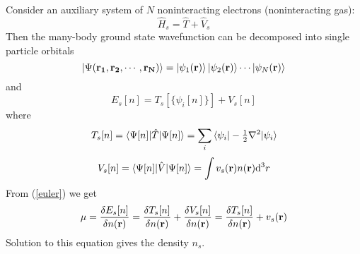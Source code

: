 Consider an auxiliary system of $N$ noninteracting electrons (noninteracting gas): 
\begin{equation*}
  \hat H_s=\hat T+\hat V_s
\end{equation*}
Then the many-body ground state wavefunction can be decomposed into single particle orbitals 
\begin{equation*}
  \mathinner{|{\Psi ({\bf r_1},{\bf r_2},\cdots,{\bf r_N})}\rangle}= \mathinner{|{\psi_1({\bf r})}\rangle}\mathinner{|{\psi_2({\bf r})}\rangle}\cdots\mathinner{|{\psi_N({\bf r})}\rangle}
\end{equation*}
and 
\begin{equation*}
  E_s[n]=T_s[\{\psi_i[n]\}]+V_s[n]
\end{equation*}
where 
\begin{equation*}
  T_s[n]=\mathinner{\langle{\Psi[n]|\hat T|\Psi[n]}\rangle}= \sum_i\mathinner{\langle{\psi_i|-{\textstyle{1\over2}}\nabla^2|\psi_i}\rangle}
\end{equation*}
\begin{equation*}
  V_s[n]=\mathinner{\langle{\Psi[n]|\hat V|\Psi[n]}\rangle}=\int v_s({\bf r})n({\bf r}){\rm d}^3r
\end{equation*}
From (\ref{euler}) we get 
\begin{equation}
  \mu={\delta E_s[n]\over\delta n({\bf r})}= {\delta T_s[n]\over\delta n({\bf r})}+{\delta V_s[n]\over\delta n({\bf r})}= {\delta T_s[n]\over\delta n({\bf r})}+v_s({\bf r})  \label{noninteract}
\end{equation}
Solution to this equation gives the density $n_s$.

